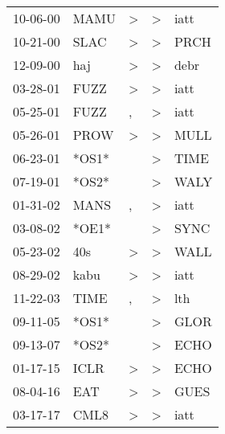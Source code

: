 \begin{supertabular}{lllll}
 10-06-00 &   MAMU &  \textgreater &  \textgreater &  iatt \\
 10-21-00 &   SLAC &  \textgreater &  \textgreater &  PRCH \\
 12-09-00 &    haj &  \textgreater &  \textgreater &  debr \\
 03-28-01 &   FUZZ &  \textgreater &  \textgreater &  iatt \\
 05-25-01 &   FUZZ &             , &  \textgreater &  iatt \\
 05-26-01 &   PROW &  \textgreater &  \textgreater &  MULL \\
 06-23-01 &  *OS1* &               &  \textgreater &  TIME \\
 07-19-01 &  *OS2* &               &  \textgreater &  WALY \\
 01-31-02 &   MANS &             , &  \textgreater &  iatt \\
 03-08-02 &  *OE1* &               &  \textgreater &  SYNC \\
 05-23-02 &    40s &  \textgreater &  \textgreater &  WALL \\
 08-29-02 &   kabu &  \textgreater &  \textgreater &  iatt \\
 11-22-03 &   TIME &             , &  \textgreater &   lth \\
 09-11-05 &  *OS1* &               &  \textgreater &  GLOR \\
 09-13-07 &  *OS2* &               &  \textgreater &  ECHO \\
 01-17-15 &   ICLR &  \textgreater &  \textgreater &  ECHO \\
 08-04-16 &    EAT &  \textgreater &  \textgreater &  GUES \\
 03-17-17 &   CML8 &  \textgreater &  \textgreater &  iatt \\
\end{supertabular}
